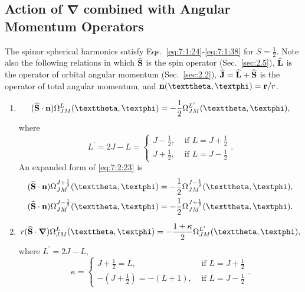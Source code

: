 \subsection{Action of $\boldsymbol{\nabla}$ combined with Angular Momentum Operators}\label{sec:7.2.5}
The spinor spherical harmonics satisfy Eqs.~\eqref{eq:7:1:24}-\eqref{eq:7:1:38} for $S=\frac{1}{2}$. Note also the following relations in which $\widehat{\mathbf{S}}$ is the spin operator (Sec.~\ref{sec:2.5}), $\widehat{\mathbf{L}}$ is the operator of orbital angular momentum (Sec.~\ref{sec:2.2}), $\widehat{\mathbf{J}}=\widehat{\mathbf{L}}+\widehat{\mathbf{S}}$ is the operator of total angular momentum, and $\vect{n}(\vartheta, \varphi)=\vect{r} / r$.
\begin{enumerate}[label=(\alph*)]
\item
\begin{equation}
(\widehat{\vect{S}} \cdot \vect{n}) \Omega_{J M}^{L}(\vartheta, \varphi)=-\frac{1}{2} \Omega_{J M}^{L^{\prime}}(\vartheta, \varphi), \label{eq:7:2:23}
\end{equation}
where
\begin{equation}
L^{\prime}=2 J-L= \begin{cases}J-\frac{1}{2}, & \text { if } L=J+\frac{1}{2}  \\ J+\frac{1}{2}, & \text { if } L=J-\frac{1}{2}\end{cases}. \label{eq:7:2:24}
\end{equation}
An expanded form of \eqref{eq:7:2:23} is
\begin{align}
& (\widehat{\vect{S}} \cdot \vect{n}) \Omega_{J M}^{J+\frac{1}{2}}(\vartheta, \varphi)=-\frac{1}{2} \Omega_{J M}^{J-\frac{1}{2}}(\vartheta, \varphi),  \notag\\
& (\widehat{\vect{S}} \cdot \vect{n}) \Omega_{J M}^{J-\frac{1}{2}}(\vartheta, \varphi)=-\frac{1}{2} \Omega_{J M}^{J+\frac{1}{2}}(\vartheta, \varphi). \label{eq:7:2:25}
\end{align}
\item
\begin{equation}
r(\widehat{\vect{S}}\cdot \boldsymbol{\nabla}) \Omega_{J M}^{L}(\vartheta, \varphi)=-\frac{1+\kappa}{2} \Omega_{J M}^{L^{\prime}}(\vartheta, \varphi), \label{eq:7:2:26}
\end{equation}
where $L^{\prime}=2 J-L$,
\begin{equation}
\kappa= \begin{cases}J+\frac{1}{2}=L, & \text { if } L=J+\frac{1}{2}  \\ -\left(J+\frac{1}{2}\right)=-(L+1), & \text { if } L=J-\frac{1}{2}\end{cases}. \label{eq:7:2:27}

\end{equation}
\end{enumerate}
